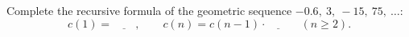 Complete the recursive formula of the geometric sequence $-0.6,\ 3,\ -15,\ 75,\ \dots$:
\[
c(1)=\underline{\qquad},\qquad c(n)=c(n-1)\cdot\underline{\qquad}\quad(n\ge2).
\]
